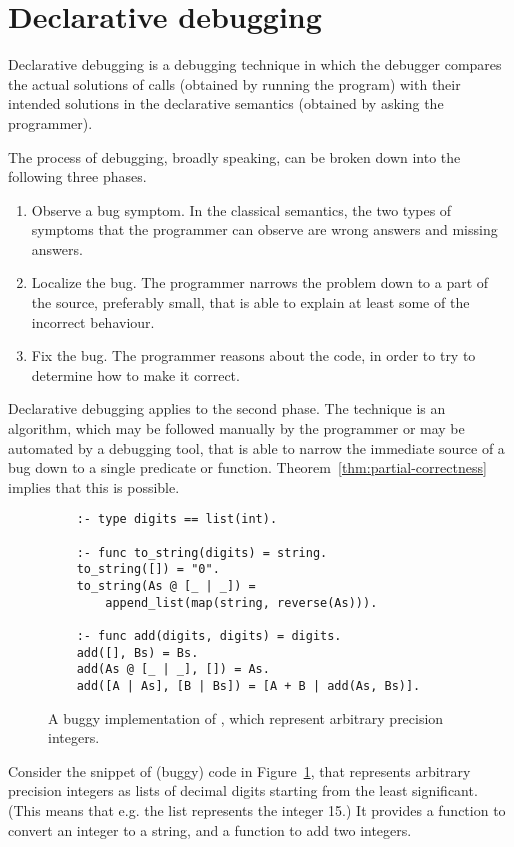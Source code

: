 \section{Declarative debugging}
\label{sec:decl-debug}

Declarative debugging is a debugging technique
in which the debugger compares the actual solutions of calls
(obtained by running the program)
with their intended solutions in the declarative semantics
(obtained by asking the programmer).

The process of debugging, broadly speaking,
can be broken down into the following three phases.
\begin{enumerate}
\item
Observe a bug symptom.
In the classical semantics,
the two types of symptoms that the programmer can observe
are wrong answers and missing answers.
\item
Localize the bug.
The programmer narrows the problem down to a part of the source,
preferably small,
that is able to explain at least some of the incorrect behaviour.
\item
Fix the bug.
The programmer reasons about the code,
in order to try to determine how to make it correct.
\end{enumerate}
Declarative debugging applies to the second phase.
The technique is an algorithm,
which may be followed manually by the programmer
or may be automated by a debugging tool,
that is able to narrow the immediate source of a bug
down to a single predicate or function.
Theorem~\ref{thm:partial-correctness} implies that this is possible.

\begin{figure}[htb]
\begin{verbatim}
    :- type digits == list(int).

    :- func to_string(digits) = string.
    to_string([]) = "0".
    to_string(As @ [_ | _]) =
        append_list(map(string, reverse(As))).

    :- func add(digits, digits) = digits.
    add([], Bs) = Bs.
    add(As @ [_ | _], []) = As.
    add([A | As], [B | Bs]) = [A + B | add(As, Bs)].
\end{verbatim}
\caption{
A buggy implementation of ,
which represent arbitrary precision integers.
\label{fig:buggy-ints}}
\end{figure}

Consider the snippet of (buggy) code in Figure~\ref{fig:buggy-ints},
that represents arbitrary precision integers
as lists of decimal digits
starting from the least significant.
(This means that e.g.\: the list \co{[5,1]} represents the integer 15.)
It provides a function
to convert an integer to a string,
and a function to add two integers.

